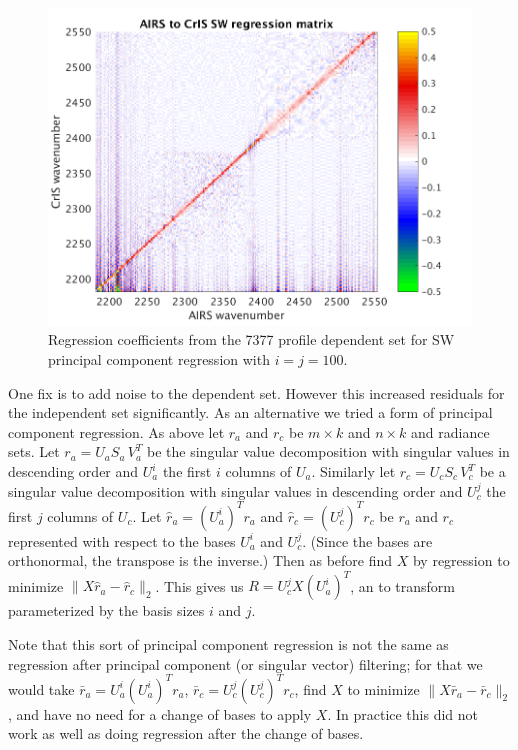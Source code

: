 \documentclass[journal]{IEEEtran}
\begin{document}
\begin{figure} %
  \centering
  \includegraphics[width=\linewidth]{figures/SW_pc_regr_mat.png}
  \caption{Regression coefficients from the 7377 profile dependent
    set for SW principal component regression with $i = j = 100$.}
  \label{dreg9}
\end{figure}

One fix is to add noise to the dependent set.  However this
increased residuals for the independent set significantly.  As an
alternative we tried a form of principal component regression.  As
above let $r_a$ and $r_c$ be $m \times k$ and $n \times k$ {\airs}
and {\cris} radiance sets.  Let $r_a = U_a S_a\,V_a^T$ be the
singular value decomposition with singular values in descending
order and $U_a^i$ the first $i$ columns of $U_a$.  Similarly let
$r_c = U_c S_c\,V_c^T$ be a singular value decomposition with
singular values in descending order and $U_c^j$ the first $j$
columns of $U_c$.  Let $\hat r_a = (U_a^i)^T r_a$ and $\hat r_c =
(U_c^j)^T r_c$ be $r_a$ and $r_c$ represented with respect to the
bases $U_a^i$ and $U_c^j$.  (Since the bases are orthonormal, the
transpose is the inverse.)  Then as before find $X$ by regression to
minimize $\|X \hat r_a - \hat r_c\|_2$.  This gives us $R = U_c^j X
(U_a^i)^T$, an {\airs} to {\cris} transform parameterized by the
basis sizes $i$ and $j$.


Note that this sort of principal component regression is not the
same as regression after principal component (or singular vector)
filtering; for that we would take $\bar r_a = U_a^i (U_a^i)^T r_a$,
$\bar r_c = U_c^j (U_c^j)^T r_c$, find $X$ to minimize $\|X \bar r_a
- \bar r_c\|_2$, and have no need for a change of bases to apply
$X$.  In practice this did not work as well as doing regression
after the change of bases.
\end{document}
